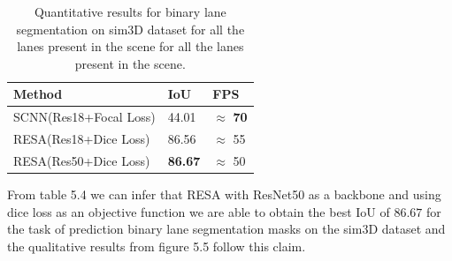            \begin{table}[h]
    \caption{Quantitative results for binary lane segmentation on sim3D dataset \cite{guo2020gen} for all the lanes present in the scene for all the lanes present in the scene.}
    \centering
    \begin{tabular}{|l|l|l|}
    \hline
        \textbf{Method} & \textbf{IoU} & \textbf{FPS} \\ \hline
        SCNN(Res18+Focal Loss) & 44.01 & $\approx$ \textbf{70} \\\hline
        RESA(Res18+Dice Loss) & 86.56 & $\approx$ 55 \\\hline
        RESA(Res50+Dice Loss) & \textbf{86.67} & $\approx$ 50 \\\hline
    \end{tabular}
\end{table}
From table 5.4 we can infer that RESA \cite{DBLP:journals/corr/abs-2008-13719} with ResNet50 as a backbone and using dice loss as an objective function we are able to obtain the best IoU of $86.67$ for the task of prediction binary lane segmentation masks on the sim3D dataset \cite{guo2020gen} and the qualitative results from figure 5.5 follow this claim. 
